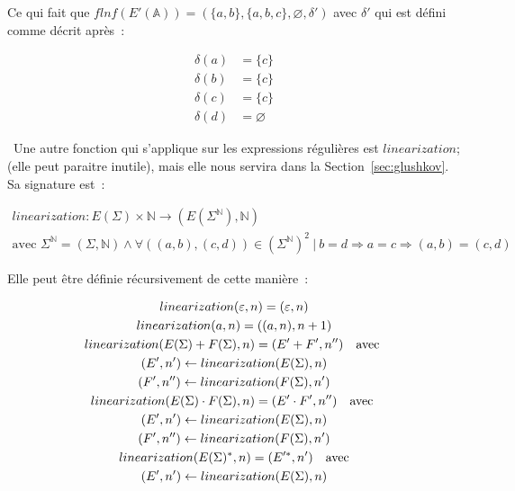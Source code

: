\begin{example}
    Ce qui fait que \(flnf(E'(\mathbb{A})) = (\{a, b\}, \{a, b, c\}, \varnothing,
    \delta')\) avec \(\delta'\) qui est défini comme décrit après~:

    \begin{align*}
        \delta(a) & = \{c\}       \\
        \delta(b) & = \{c\}       \\
        \delta(c) & = \{c\}       \\
        \delta(d) & = \varnothing
    \end{align*}

\end{example}

\vphantom{}

\textbullet~Une autre fonction qui s'applique sur les expressions régulières
est \(linearization\);(elle peut paraitre inutile), mais elle nous servira dans
la Section~\ref{sec:glushkov}. Sa signature est~:

\begin{gather*}
    linearization: E(\Sigma) \times \mathbb{N} \to (E(\Sigma^{\mathbb{N}}), \mathbb{N}) \\
    \text{avec } \Sigma^{\mathbb{N}} = (\Sigma, \mathbb{N}) \land \forall ((a, b), (c, d)) \in (\Sigma^{\mathbb{N}})^2 ~|~ b = d \Rightarrow a = c \Rightarrow (a, b) = (c, d)
\end{gather*}

Elle peut être définie récursivement de cette manière~:

\begin{gather}
    linearization(\varepsilon, n) = (\varepsilon, n) \\
    linearization(a, n) = ((a, n), n + 1) \\
    linearization(E(\Sigma) + F(\Sigma), n) = (E' + F', n'') \quad \text{avec } \\
    (E', n') \leftarrow linearization(E(\Sigma), n) \notag \\
    (F', n'') \leftarrow linearization(F(\Sigma), n') \notag \\
    linearization(E(\Sigma) \cdot F(\Sigma), n) = (E' \cdot F', n'') \quad
    \text{avec } \\
    (E', n') \leftarrow linearization(E(\Sigma), n) \notag \\
    (F', n'') \leftarrow linearization(F(\Sigma), n') \notag \\
    linearization(E(\Sigma)^*, n) = (E'^*, n') \quad \text{avec} \\
    (E', n') \leftarrow linearization(E(\Sigma), n) \notag
\end{gather}


